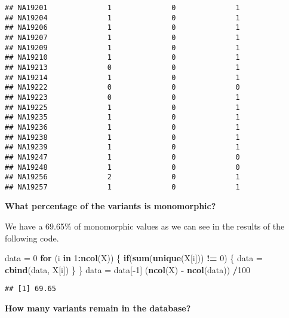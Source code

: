\documentclass[]{article}
\newenvironment{Shaded}{\begin{snugshade}}{\end{snugshade}}
\newcommand{\KeywordTok}[1]{\textcolor[rgb]{0.13,0.29,0.53}{\textbf{#1}}}
\newcommand{\DecValTok}[1]{\textcolor[rgb]{0.00,0.00,0.81}{#1}}
\newcommand{\StringTok}[1]{\textcolor[rgb]{0.31,0.60,0.02}{#1}}
\newcommand{\ControlFlowTok}[1]{\textcolor[rgb]{0.13,0.29,0.53}{\textbf{#1}}}
\newcommand{\OperatorTok}[1]{\textcolor[rgb]{0.81,0.36,0.00}{\textbf{#1}}}
\newcommand{\NormalTok}[1]{#1}
\begin{document}
\begin{verbatim}
## NA19201              1              0              1
## NA19204              1              0              1
## NA19206              1              0              1
## NA19207              1              0              1
## NA19209              1              0              1
## NA19210              1              0              1
## NA19213              0              0              1
## NA19214              1              0              1
## NA19222              0              0              0
## NA19223              0              0              1
## NA19225              1              0              1
## NA19235              1              0              1
## NA19236              1              0              1
## NA19238              1              0              1
## NA19239              1              0              1
## NA19247              1              0              0
## NA19248              1              0              0
## NA19256              2              0              1
## NA19257              1              0              1
\end{verbatim}

\textbf{What percentage of the variants is monomorphic?}

We have a 69.65\% of monomorphic values as we can see in the results of
the following code.

\begin{Shaded}
\begin{Highlighting}[]
\NormalTok{data =}\StringTok{ }\DecValTok{0}
\ControlFlowTok{for}\NormalTok{ (i }\ControlFlowTok{in} \DecValTok{1}\OperatorTok{:}\KeywordTok{ncol}\NormalTok{(X))}
\NormalTok{  \{}
    \ControlFlowTok{if}\NormalTok{(}\KeywordTok{sum}\NormalTok{(}\KeywordTok{unique}\NormalTok{(X[i])) }\OperatorTok{!=}\StringTok{ }\DecValTok{0}\NormalTok{) }
\NormalTok{      \{}
\NormalTok{      data =}\StringTok{ }\KeywordTok{cbind}\NormalTok{(data, X[i]) }
\NormalTok{      \}}
\NormalTok{\}}
\NormalTok{data =}\StringTok{ }\NormalTok{data[}\OperatorTok{-}\DecValTok{1}\NormalTok{]}
\NormalTok{(}\KeywordTok{ncol}\NormalTok{(X) }\OperatorTok{-}\StringTok{ }\KeywordTok{ncol}\NormalTok{(data)) }\OperatorTok{/}\DecValTok{100} 
\end{Highlighting}
\end{Shaded}

\begin{verbatim}
## [1] 69.65
\end{verbatim}

\textbf{How many variants remain in the database?}
\end{document}
